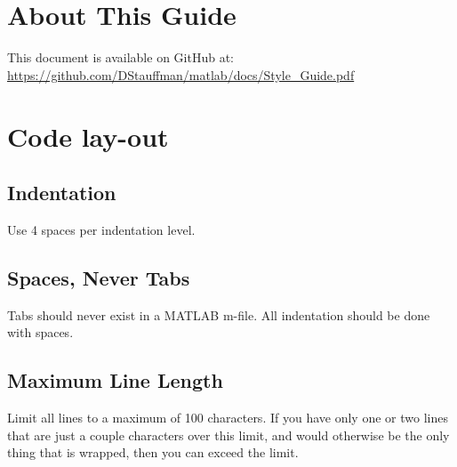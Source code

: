 \documentclass[12pt]{article}
\begin{document}
\section{About This Guide}\label{h2:about_guide}
This document is available on GitHub at:
\newline\url{https://github.com/DStauffman/matlab/docs/Style_Guide.pdf}

\section{Code lay-out}

\subsection{Indentation}
Use 4 spaces per indentation level.

\subsection{Spaces, Never Tabs}
Tabs should never exist in a MATLAB m-file.  All indentation should be done with spaces.

\subsection{Maximum Line Length}
Limit all lines to a maximum of 100 characters.  If you have only one or two lines that are just a couple characters over this limit, and would otherwise be the only thing that is wrapped, then you can exceed the limit.
\end{document}
